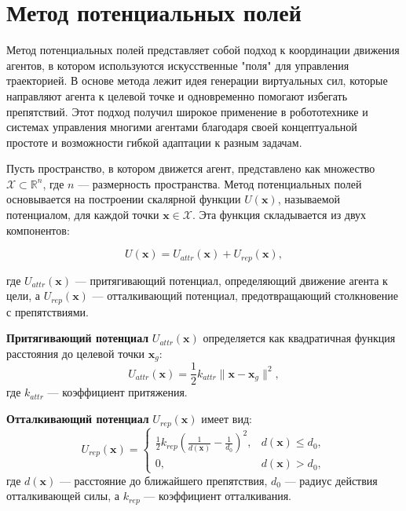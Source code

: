 \iffalse
\section{Метод потенциальных полей}

Метод потенциальных полей представляет собой подход к координации движения агентов, в котором используются искусственные "поля" для управления траекторией. В основе метода лежит идея генерации виртуальных сил, которые направляют агента к целевой точке и одновременно помогают избегать препятствий. Этот подход получил широкое применение в робототехнике и системах управления многими агентами благодаря своей концептуальной простоте и возможности гибкой адаптации к разным задачам.

Пусть пространство, в котором движется агент, представлено как множество $\mathcal{X} \subset \mathbb{R}^n$, где $n$ — размерность пространства. Метод потенциальных полей основывается на построении скалярной функции $U(\mathbf{x})$, называемой потенциалом, для каждой точки $\mathbf{x} \in \mathcal{X}$. Эта функция складывается из двух компонентов:

\begin{equation}
	U(\mathbf{x}) = U_{attr}(\mathbf{x}) + U_{rep}(\mathbf{x}),
\end{equation}

где $U_{attr}(\mathbf{x})$ — притягивающий потенциал, определяющий движение агента к цели, а $U_{rep}(\mathbf{x})$ — отталкивающий потенциал, предотвращающий столкновение с препятствиями.

\textbf{Притягивающий потенциал} $U_{attr}(\mathbf{x})$ определяется как квадратичная функция расстояния до целевой точки $\mathbf{x}_g$:
\begin{equation}
	U_{attr}(\mathbf{x}) = \frac{1}{2}k_{attr}\|\mathbf{x} - \mathbf{x}_g\|^2,
\end{equation}
где $k_{attr}$ — коэффициент притяжения.

\textbf{Отталкивающий потенциал} $U_{rep}(\mathbf{x})$ имеет вид:
\begin{equation}
	U_{rep}(\mathbf{x}) = \begin{cases} 
		\frac{1}{2}k_{rep}\left(\frac{1}{d(\mathbf{x})} - \frac{1}{d_0}\right)^2, & d(\mathbf{x}) \leq d_0, \\
		0, & d(\mathbf{x}) > d_0,
	\end{cases}
\end{equation}
где $d(\mathbf{x})$ — расстояние до ближайшего препятствия, $d_0$ — радиус действия отталкивающей силы, а $k_{rep}$ — коэффициент отталкивания.

